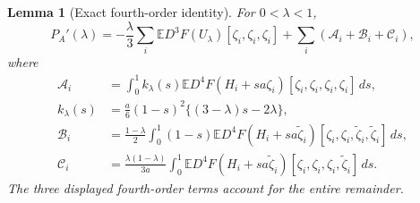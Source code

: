\documentclass[11pt,letterpaper]{article}
\newtheorem{lemma}{Lemma}
\theoremstyle{remark}
\newcommand{\E}{\mathbb E}
\newcommand{\dd}{\,d}
\begin{document}
\begin{lemma}[Exact fourth-order identity]\label{appx-an:lem:identity}
For \(0<\lambda<1\),
\begin{equation}
 P_A'(\lambda)
 =-\frac\lambda3\sum_i\E D^3F(U_\lambda)
                    [\zeta_i,\zeta_i,\zeta_i]
       +\sum_i(\mathcal A_i+\mathcal B_i+\mathcal C_i),
 \label{appx-an:fourth-identity}
\end{equation}
where
\begin{align}
 \mathcal A_i
 &=\int_0^1 k_\lambda(s)
       \E D^4F(H_i+sa\zeta_i)
                 [\zeta_i,\zeta_i,\zeta_i,\zeta_i]\dd s,
 \label{appx-an:A}\\
 k_\lambda(s)
 &=\frac a6(1-s)^2\{(3-\lambda)s-2\lambda\},
 \label{appx-an:kernel}\\
 \mathcal B_i
 &=\frac{1-\lambda}{2}\int_0^1(1-s)
       \E D^4F(H_i+sa\widetilde\zeta_i)
          [\zeta_i,\zeta_i,\widetilde\zeta_i,\widetilde\zeta_i]
       \dd s,
 \label{appx-an:B}\\
 \mathcal C_i
 &=\frac{\lambda(1-\lambda)}{3a}\int_0^1
       \E D^4F(H_i+sa\widetilde\zeta_i)
          [\zeta_i,\zeta_i,\zeta_i,\widetilde\zeta_i]\dd s.
 \label{appx-an:C}
\end{align}
The three displayed fourth-order terms account for the entire remainder.
\end{lemma}
\end{document}
